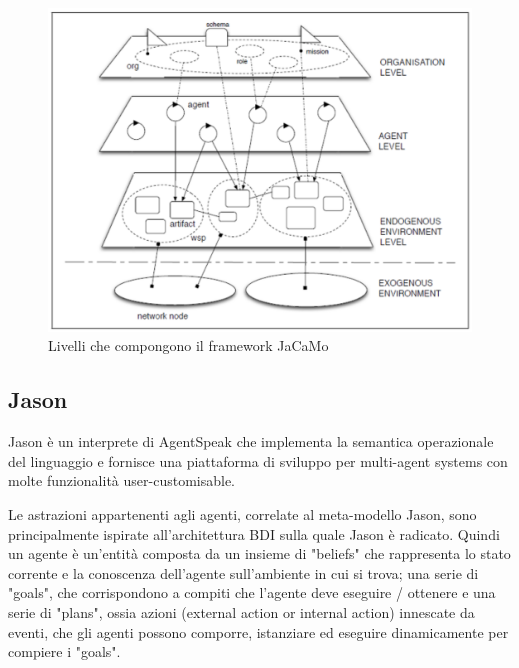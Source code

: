 \begin{figure}[H]
\centering
\includegraphics[width=\textwidth]{figures/JaCaMo_levels.png}
\caption{Livelli che compongono il framework JaCaMo\cite{BOISSIER2013747}}
\label{livelli_jacamo}
\end{figure}

\subsection{Jason} \label{jason}

Jason è un interprete di AgentSpeak che implementa la semantica operazionale del linguaggio e fornisce una piattaforma di sviluppo per multi-agent systems con molte funzionalità user-customisable.

\medskip

Le astrazioni appartenenti agli agenti, correlate al meta-modello Jason, sono principalmente ispirate all'architettura BDI sulla quale Jason è radicato. Quindi un agente è un'entità composta da un insieme di "beliefs" che rappresenta lo stato corrente e la conoscenza dell'agente sull'ambiente in cui si trova; una serie di "goals", che corrispondono a compiti che l'agente deve eseguire / ottenere e una serie di "plans", ossia azioni (external action or internal action) innescate da eventi, che gli agenti possono comporre, istanziare ed eseguire dinamicamente per compiere i "goals".\cite{jason-book}

